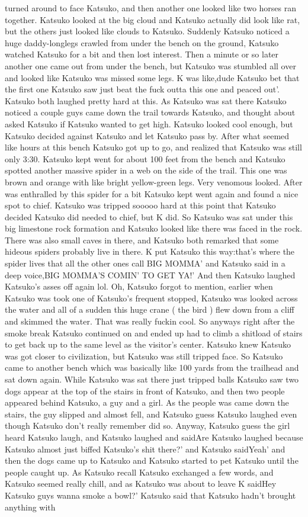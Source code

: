 \documentclass[12pt]{book}
\begin{document}
turned around to face Katsuko, and then another one looked like two horses ran together. Katsuko looked at the big cloud and Katsuko actually did look like rat, but the others just looked like clouds to Katsuko. Suddenly Katsuko noticed a huge daddy-longlegs crawled from under the bench on the ground, Katsuko watched Katsuko for a bit and then lost interest. Then a minute or so later another one came out from under the bench, but Katsuko was stumbled all over and looked like Katsuko was missed some legs. K was like,dude Katsuko bet that the first one Katsuko saw just beat the fuck outta this one and peaced out'. Katsuko both laughed pretty hard at this. As Katsuko was sat there Katsuko noticed a couple guys came down the trail towards Katsuko, and thought about asked Katsuko if Katsuko wanted to get high. Katsuko looked cool enough, but Katsuko decided against Katsuko and let Katsuko pass by. After what seemed like hours at this bench Katsuko got up to go, and realized that Katsuko was still only 3:30. Katsuko kept went for about 100 feet from the bench and Katsuko spotted another massive spider in a web on the side of the trail. This one was brown and orange with like bright yellow-green legs. Very venomous looked. After was enthralled by this spider for a bit Katsuko kept went again and found a nice spot to chief. Katsuko was tripped sooooo hard at this point that Katsuko decided Katsuko did needed to chief, but K did. So Katsuko was sat under this big limestone rock formation and Katsuko looked like there was faced in the rock. There was also small caves in there, and Katsuko both remarked that some hideous spiders probably live in there. K put Katsuko this way:that's where the spider lives that all the other ones call BIG MOMMA' and Katsuko said in a deep voice,BIG MOMMA'S COMIN' TO GET YA!' And then Katsuko laughed Katsuko's asses off again lol. Oh, Katsuko forgot to mention, earlier when Katsuko was took one of Katsuko's frequent stopped, Katsuko was looked across the water and all of a sudden this huge crane ( the bird ) flew down from a cliff and skimmed the water. That was really fuckin cool. So anyways right after the smoke break Katsuko continued on and ended up had to climb a shitload of stairs to get back up to the same level as the visitor's center. Katsuko knew Katsuko was got closer to civilization, but Katsuko was still tripped face. So Katsuko came to another bench which was basically like 100 yards from the trailhead and sat down again. While Katsuko was sat there just tripped balls Katsuko saw two dogs appear at the top of the stairs in front of Katsuko, and then two people appeared behind Katsuko, a guy and a girl. As the people was came down the stairs, the guy slipped and almost fell, and Katsuko guess Katsuko laughed even though Katsuko don't really remember did so. Anyway, Katsuko guess the girl heard Katsuko laugh, and Katsuko laughed and saidAre Katsuko laughed because Katsuko almost just biffed Katsuko's shit there?' and Katsuko saidYeah' and then the dogs came up to Katsuko and Katsuko started to pet Katsuko until the people caught up. As Katsuko recall Katsuko exchanged a few words, and Katsuko seemed really chill, and as Katsuko was about to leave K saidHey Katsuko guys wanna smoke a bowl?' Katsuko said that Katsuko hadn't brought anything with 
\end{document}
